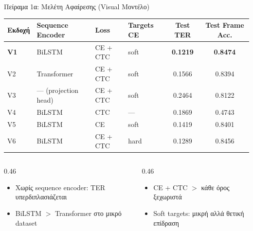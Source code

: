 \documentclass[aspectratio=169,10pt,xcolor=table]{beamer}
\begin{document}
\begin{frame}{Πείραμα 1α: Μελέτη Αφαίρεσης (Visual Μοντέλο)}
  \centering
  {\small
  \renewcommand{\arraystretch}{1.15}
  \begin{tabular}{llllcc}
    \toprule
    \textbf{Εκδοχή} & \textbf{Sequence Encoder} & \textbf{Loss} & \textbf{Targets CE} & \textbf{Test TER} & \textbf{Test Frame Acc.}  \\
    \midrule
    \rowcolor{accent!12}
    \textbf{V1} & BiLSTM & CE + CTC & soft & \textbf{0.1219} & \textbf{0.8474} \\
    V2 & Transformer & CE + CTC & soft & 0.1566 & 0.8394 \\
    V3 & --- (projection head) & CE + CTC & soft & 0.2464 & 0.8122 \\
    V4 & BiLSTM & CTC & --- & 0.1869 & 0.4743 \\
    V5 & BiLSTM & CE & soft & 0.1419 & 0.8401 \\
    V6 & BiLSTM & CE + CTC & hard & 0.1289 & 0.8456 \\
    \bottomrule
  \end{tabular}}

  \vspace{4mm}
  \begin{columns}[T]
    \begin{column}{0.46\textwidth}
      \begin{itemize}
        \item Χωρίς sequence encoder: TER υπερδιπλασιάζεται
        \item BiLSTM $>$ Transformer στο μικρό dataset
      \end{itemize}
    \end{column}
    \begin{column}{0.46\textwidth}
      \begin{itemize}
        \item CE + CTC $>$ κάθε όρος ξεχωριστά
        \item Soft targets: μικρή αλλά θετική επίδραση
      \end{itemize}
    \end{column}
  \end{columns}
\end{frame}
\end{document}
